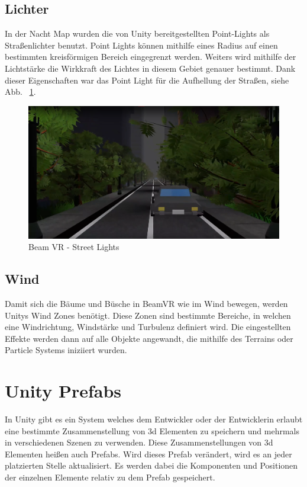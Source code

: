 \subsection{Lichter}\label{subsec:light-effect}
In der Nacht Map wurden die von Unity bereitgestellten Point-Lights als Straßenlichter benutzt.
Point Lights k\"onnen mithilfe eines Radius auf einen bestimmten kreisf\"ormigen Bereich eingegrenzt werden.
Weiters wird mithilfe der Lichtst\"arke die Wirkkraft des Lichtes in diesem Gebiet genauer bestimmt.
Dank dieser Eigenschaften war das Point Light f\"ur die Aufhellung der Straßen, siehe Abb. ~\ref{fig:beamvr_street_lights}.
~\cite{Unity_PointLights_2022}
\begin {figure}
    \centering
    \includegraphics[scale=0.3]{pics/beamvr_point_lights}
    \caption{Beam VR - Street Lights}
    \label{fig:beamvr_street_lights}
\end {figure}

\subsection{Wind}\label{subsec:wind-effect}
Damit sich die B\"aume und B\"usche in BeamVR wie im Wind bewegen, werden Unitys Wind Zones ben\"otigt.
Diese Zonen sind bestimmte Bereiche, in welchen eine Windrichtung, Windst\"arke und Turbulenz definiert wird.
Die eingestellten Effekte werden dann auf alle Objekte angewandt, die mithilfe des Terrains oder Particle Systems iniziiert wurden.
~\cite{Unity_WindZones_2022}

\section{Unity Prefabs}
\label{sec:prefabs}

In Unity gibt es ein System welches dem Entwickler oder der Entwicklerin erlaubt eine bestimmte Zusammenstellung von 3d Elementen zu speichern und mehrmals in verschiedenen Szenen zu verwenden.
Diese Zusammenstellungen von 3d Elementen heißen auch Prefabs.
Wird dieses Prefab verändert, wird es an jeder platzierten Stelle aktualisiert.
Es werden dabei die Komponenten und Positionen der einzelnen Elemente relativ zu dem Prefab gespeichert.

